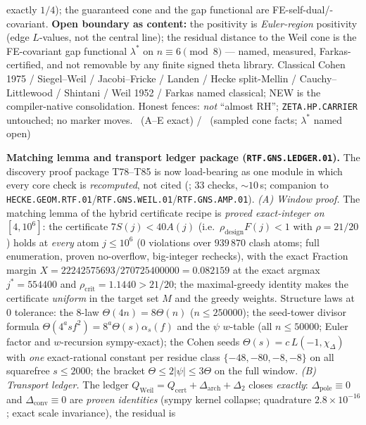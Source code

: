 \documentclass[11pt,a4paper]{article}
\theoremstyle{definition}
\begin{document}
exactly $1/4$); the guaranteed cone and the gap functional are
FE-self-dual/-covariant.
\textbf{Open boundary as content:} the positivity is \emph{Euler-region} positivity
(edge $L$-values, not the central line); the residual distance to the Weil cone is
the FE-covariant gap functional $\lambda^*$ on $n\equiv6\pmod 8$ --- named,
measured, Farkas-certified, and not removable by any finite signed theta library.
Classical Cohen 1975 / Siegel--Weil / Jacobi--Fricke / Landen / Hecke split-Mellin /
Cauchy--Littlewood / Shintani / Weil 1952 / Farkas named classical; NEW is the
compiler-native consolidation.
Honest fences: \emph{not} ``almost RH''; \texttt{ZETA.HP.CARRIER} untouched;
no marker moves.
\mE\ (A--E exact) / \mC\ (sampled cone facts; $\lambda^*$ named open)

\par\smallskip\noindent\textbf{Matching lemma and transport ledger package
(\texttt{RTF.GNS.LEDGER.01}).}
The discovery proof package T78--T85 is now load-bearing as one module in which
every core check is \emph{recomputed}, not cited
(; $33$ checks, $\sim10$\,s; companion to
\texttt{HECKE.GEOM.RTF.01}/\texttt{RTF.GNS.WEIL.01}/\texttt{RTF.GNS.AMP.01}).
\emph{(A) Window proof.} The matching lemma of the hybrid certificate recipe is
\emph{proved exact-integer on $[4,10^6]$}: the certificate $7S(j)<40A(j)$
(i.e.\ $\rho_{\mathrm{design}}F(j)<1$ with $\rho=21/20$) holds at \emph{every}
atom $j\le10^6$ ($0$ violations over $939\,870$ clash atoms; full enumeration,
proven no-overflow, big-integer rechecks), with the exact Fraction margin
$X=22242575693/270725400000=0.082159$ at the exact argmax $j^*=554400$ and
$\rho_{\mathrm{crit}}=1.1440>21/20$; the maximal-greedy identity makes the
certificate \emph{uniform} in the target set $M$ and the greedy weights.
Structure laws at $0$ tolerance: the $8$-law $\Theta(4n)=8\Theta(n)$
($n\le250000$); the seed-tower divisor formula
$\Theta(4^asf^2)=8^a\Theta(s)\alpha_s(f)$ and the $\psi$ $w$-table (all
$n\le50000$; Euler factor and $w$-recursion sympy-exact); the Cohen seeds
$\Theta(s)=c\,L(-1,\chi_\Delta)$ with \emph{one} exact-rational constant per
residue class $\{-48,-80,-8,-8\}$ on all squarefree $s\le2000$; the bracket
$\Theta\le2|\psi|\le3\Theta$ on the full window.
\emph{(B) Transport ledger.} The ledger
$Q_{\mathrm{Weil}}=Q_{\mathrm{cert}}+\Delta_{\mathrm{arch}}+\Delta_2$ closes
\emph{exactly}: $\Delta_{\mathrm{pole}}\equiv0$ and $\Delta_{\mathrm{conv}}\equiv0$
are \emph{proven identities} (sympy kernel collapse; quadrature
$2.8\times10^{-16}$; exact scale invariance), the residual is
\end{document}
